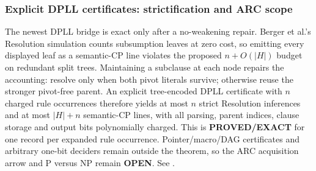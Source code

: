 \subsubsection*{Explicit DPLL certificates: strictification and ARC scope}
The newest DPLL bridge is exact only after a no-weakening repair.  Berger
et al.'s Resolution simulation counts subsumption leaves at zero cost, so
emitting every displayed leaf as a semantic-CP line violates the proposed
$n+O(|H|)$ budget on redundant split trees.  Maintaining a subclause at each
node repairs the accounting: resolve only when both pivot literals survive;
otherwise reuse the stronger pivot-free parent.  An explicit tree-encoded
DPLL certificate with $n$ charged rule occurrences therefore yields at most
$n$ strict Resolution inferences and at most $|H|+n$ semantic-CP lines, with
all parsing, parent indices, clause storage and output bits polynomially
charged.  This is \textbf{PROVED/EXACT} for one record per expanded rule
occurrence.  Pointer/macro/DAG certificates and arbitrary one-bit deciders
remain outside the theorem, so the ARC acquisition arrow and P versus NP
remain \textbf{OPEN}.  See
.
